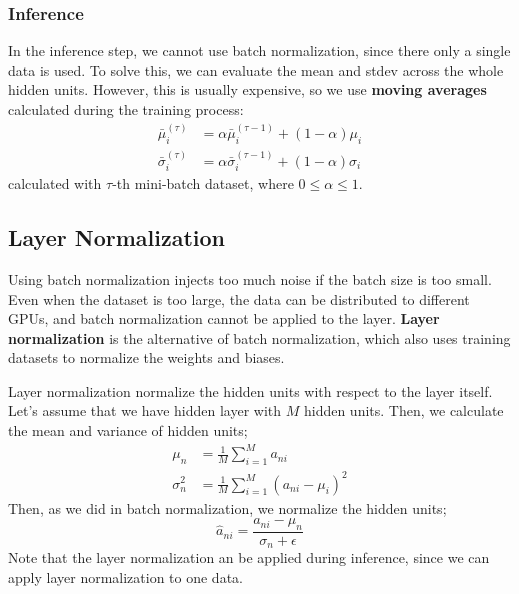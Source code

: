 \documentclass{article}
\begin{document}
        \subsubsection{Inference}
            In the inference step, we cannot use batch normalization, since there only a single data is
            used. To solve this, we can evaluate the mean and stdev across the whole hidden units.
            However, this is usually expensive, so we use \textbf{moving averages} calculated during the
            training process:
            \begin{align}
                \bar{\mu}^{(\tau)}_i &= \alpha\bar{\mu}^{(\tau-1)}_i + (1-\alpha)\mu_i \\
                \bar{\sigma}^{(\tau)}_i &= \alpha\bar{\sigma}^{(\tau-1)}_i + (1-\alpha)\sigma_i
            \end{align}
            calculated with $\tau$-th mini-batch dataset, where $0 \leq \alpha \leq 1$.
        
    \subsection{Layer Normalization}
            Using batch normalization injects too much noise if the batch size is too small.
            Even when the dataset is too large, the data can be distributed to different GPUs, and
            batch normalization cannot be applied to the layer. \textbf{Layer normalization} is
            the alternative of batch normalization, which also uses training datasets to normalize
            the weights and biases.

            Layer normalization normalize the hidden units with respect to the layer itself.
            Let's assume that we have hidden layer with $M$ hidden units. Then, we calculate
            the mean and variance of hidden units;
            \begin{align}
                \mu_n&=\frac{1}{M}\sum_{i=1}^{M}a_{ni} \\
                \sigma_n^2&=\frac{1}{M}\sum_{i=1}^{M}(a_{ni}-\mu_i)^2
            \end{align}
            Then, as we did in batch normalization, we normalize the hidden units;
            \[
            \hat{a}_{ni} = \frac{a_{ni}-\mu_n}{\sigma_n + \epsilon}
            \]
            Note that the layer normalization an be applied during inference,
            since we can apply layer normalization to one data.
\end{document}
